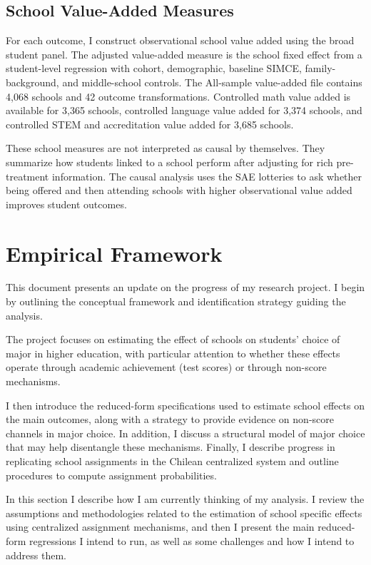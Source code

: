 \documentclass[a4paper, article, english, oneside, unknownkeysallowed, 12pt]{memoir}
\begin{document}
\subsection{School Value-Added Measures}

For each outcome, I construct observational school value added using the broad student panel. The adjusted value-added measure is the school fixed effect from a student-level regression with cohort, demographic, baseline SIMCE, family-background, and middle-school controls. The All-sample value-added file contains 4,068 schools and 42 outcome transformations. Controlled math value added is available for 3,365 schools, controlled language value added for 3,374 schools, and controlled STEM and accreditation value added for 3,685 schools.

These school measures are not interpreted as causal by themselves. They summarize how students linked to a school perform after adjusting for rich pre-treatment information. The causal analysis uses the SAE lotteries to ask whether being offered and then attending schools with higher observational value added improves student outcomes.



\clearpage 
\section{Empirical Framework}



This document presents an update on the progress of my research project. I begin by outlining the conceptual framework and identification strategy guiding the analysis.

The project focuses on estimating the effect of schools on students’ choice of major in higher education, with particular attention to whether these effects operate through academic achievement (test scores) or through non-score mechanisms.

I then introduce the reduced-form specifications used to estimate school effects on the main outcomes, along with a strategy to provide evidence on non-score channels in major choice.
In addition, I discuss a structural model of major choice that may help disentangle these mechanisms. Finally, I describe progress in replicating school assignments in the Chilean centralized system and outline procedures to compute assignment probabilities.


In this section I describe how I am currently thinking of my analysis. I review the assumptions and methodologies related to the estimation of school specific effects using centralized assignment mechanisms, and then I present the main reduced-form regressions I intend to run, as well as some challenges and how I intend to address them.
\end{document}
